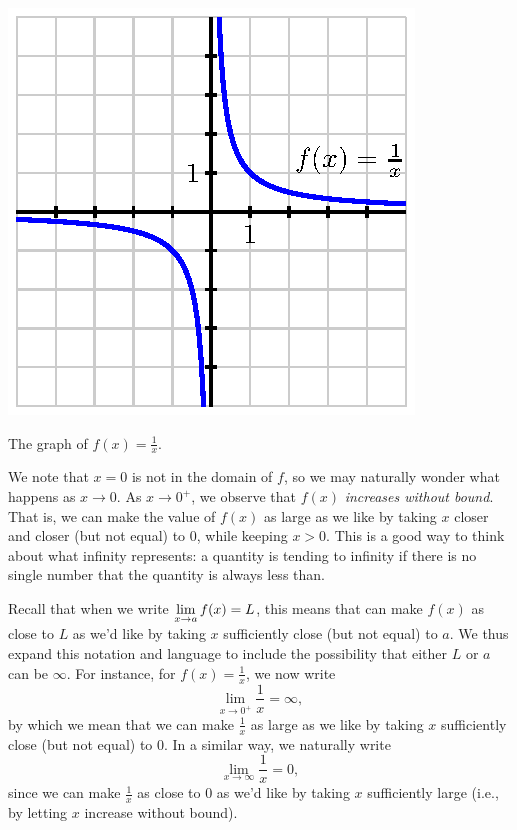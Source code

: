 \begin{marginfigure} %
\includegraphics{figures/2_8_Infty.eps}
\caption{The graph of $f(x) = \frac{1}{x}$.} \label{F:2.8.Infty}
\end{marginfigure}

We note that $x = 0$ is not in the domain of $f$, so we may naturally wonder what happens as $x \to 0$.  As $x \to 0^+$, we observe that $f(x)$ \emph{increases without bound}.  That is, we can make the value of $f(x)$ as large as we like by taking $x$ closer and closer (but not equal) to $0$, while keeping $x > 0$.  This is a good way to think about what infinity represents:  a quantity is tending to infinity if there is no single number that the quantity is always less than. 

Recall that when we write $\displaystyle \lim_{x \to a} f(x) = L$, this means that can make $f(x)$ as close to $L$ as we'd like by taking $x$ sufficiently close (but not equal) to $a$.  We thus expand this notation and language to include the possibility that either $L$ or $a$ can be $\infty$.  For instance, for $f(x) = \frac{1}{x}$, we now write
$$\lim_{x \to 0^+} \frac{1}{x} = \infty,$$
by which we mean that we can make $\frac{1}{x}$ as large as we like by taking $x$ sufficiently close (but not equal) to $0$.  In a similar way, we naturally write
$$\lim_{x \to \infty} \frac{1}{x} = 0,$$
since we can make $\frac{1}{x}$ as close to $0$ as we'd like by taking $x$ sufficiently large (i.e., by letting $x$ increase without bound).

